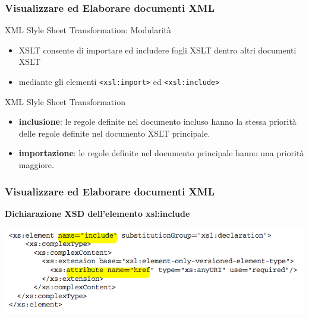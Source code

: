 \begin{frame}
    \frametitle{Visualizzare ed Elaborare documenti XML}
    \addtocounter{nframe}{1}
    

     \begin{block}{XML Slyle Sheet Transformation: Modularità}
        \begin{itemize}
            \item XSLT consente di importare ed includere fogli XSLT dentro altri documenti XSLT
            \item mediante gli elementi \texttt{<xsl:import>} ed \texttt{<xsl:include>} 
        \end{itemize}
     \end{block}

     \begin{block}{XML Slyle Sheet Transformation}
        \begin{itemize}
            \item \textbf{inclusione}: le regole definite nel documento incluso hanno la stessa priorità delle regole definite nel documento XSLT principale.
            \item \textbf{importazione}: le regole definite nel documento principale hanno una priorità maggiore.
        \end{itemize}

     \end{block}


\end{frame}


\begin{frame}
    \frametitle{Visualizzare ed Elaborare documenti XML}
    \addtocounter{nframe}{1}
    
    \textbf{Dichiarazione XSD dell'elemento xsl:include}

    \begin{center}
        \includegraphics[width=.8\textwidth]{imgs/elementXSL-Include.png}
    \end{center}

\end{frame}

